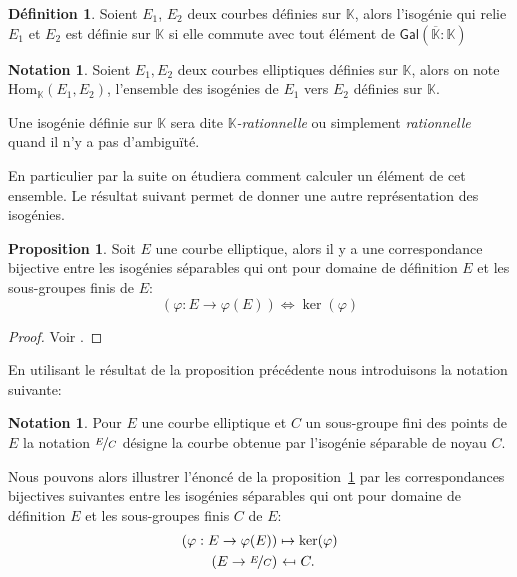 \documentclass[10pt,a4paper]{book}
\theoremstyle{plain}
\theoremstyle{definition}
\theoremstyle{definition}
\theoremstyle{definition}
\theoremstyle{definition}
\newtheorem{prop}[thm]{Proposition}
\theoremstyle{definition}
\newtheorem{defi}[thm]{Définition}
\theoremstyle{remark}
\theoremstyle{remark}
\theoremstyle{definition}
\newtheorem{nota}[thm]{Notation}
\begin{document}
\begin{defi}
Soient $E_1$, $E_2$ deux courbes définies sur $\mathbb{K}$, alors l'isogénie
qui relie $E_1$ et $E_2$ est définie sur $\mathbb{K}$ si elle commute avec tout
élément de $\mathsf{Gal}(\overline{\mathbb{K}}:\mathbb{K})$
\end{defi}

\begin{nota}
Soient $E_1, E_2$ deux courbes elliptiques définies sur $\mathbb{K}$, alors 
on note $\mathrm{Hom}_{\mathbb{K}}(E_1,E_2)$, l'ensemble des isogénies de $E_1$
vers $E_2$ définies sur $\mathbb{K}$.
\end{nota}

Une isogénie définie sur $\mathbb{K}$ sera dite \emph{$\mathbb{K}$-rationnelle}
ou simplement \emph{rationnelle} quand il n'y a pas d'ambiguïté.

En particulier par la suite on étudiera comment calculer un élément de cet 
ensemble. Le résultat suivant permet de donner une autre représentation des 
isogénies. 

\begin{prop}
\label{pro:iso:equ}
Soit $E$ une courbe elliptique, alors il y a une correspondance bijective entre les isogénies séparables qui ont pour domaine de définition $E$ et les sous-groupes finis de $E$:
\begin{equation*}
(\varphi :E\rightarrow \varphi(E)) \Longleftrightarrow  \ker(\varphi)  
\end{equation*}
\end{prop}

\begin{proof}
Voir \cite[Proposition 4.12]{Silv1}.
\end{proof}

En utilisant le résultat de la proposition précédente nous introduisons la 
notation suivante:

\begin{nota}
Pour $E$ une courbe elliptique et $C$ un sous-groupe fini des points de $E$ la notation $\nicefrac{E}{C}$ désigne la courbe obtenue par l'isogénie séparable de noyau $C$.
\end{nota}
Nous pouvons alors illustrer l'énoncé de la proposition~\ref{pro:iso:equ} par
les correspondances bijectives suivantes entre les isogénies séparables qui ont
pour domaine de définition $E$ et les sous-groupes finis $C$ de $E$:
\begin{equation*}
\begin{alignedat}{1}
(\varphi :E\rightarrow \varphi(E)) &\mapsto  \ker(\varphi)  \\
 (E\rightarrow\nicefrac{E}{C})  &\  \reflectbox{$\mapsto$} \ C. 
\end{alignedat}
\end{equation*}
\end{document}
